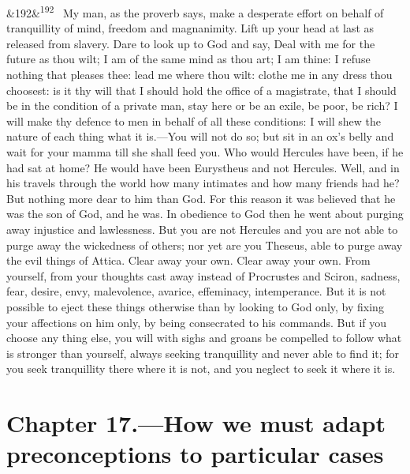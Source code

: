 \documentclass[12pt]{article}
\newcommand{\para}[1][]{\par\noindent\ifx&#1&\else\textsuperscript{\footnotesize #1}~\fi}
\begin{document}
\para[192] My man, as the proverb says, make a desperate effort on behalf of tranquillity of mind, freedom and magnanimity. Lift up your head at last as released from slavery. Dare to look up to God and say, Deal with me for the future as thou wilt; I am of the same mind as thou art; I am thine: I refuse nothing that pleases thee: lead me where thou wilt: clothe me in any dress thou choosest: is it thy will that I should hold the office of a magistrate, that I should be in the condition of a private man, stay here or be an exile, be poor, be rich? I will make thy defence to men in behalf of all these conditions: I will shew the nature of each thing what it is.—You will not do so; but sit in an ox's belly and wait for your mamma till she shall feed you. Who would Hercules have been, if he had sat at home? He would have been Eurystheus and not Hercules. Well, and in his travels through the world how many intimates and how many friends had he? But nothing more dear to him than God. For this reason it was believed that he was the son of God, and he was. In obedience to God then he went about purging away injustice and lawlessness. But you are not Hercules and you are not able to purge away the wickedness of others; nor yet are you Theseus, able to purge away the evil things of Attica. Clear away your own. Clear away your own. From yourself, from your thoughts cast away instead of Procrustes and Sciron, sadness, fear, desire, envy, malevolence, avarice, effeminacy, intemperance. But it is not possible to eject these things otherwise than by looking to God only, by fixing your affections on him only, by being consecrated to his commands. But if you choose any thing else, you will with sighs and groans be compelled to follow what is stronger than yourself, always seeking tranquillity and never able to find it; for you seek tranquillity there where it is not, and you neglect to seek it where it is.

\section*{Chapter 17.---How we must adapt preconceptions to particular cases}
\end{document}

